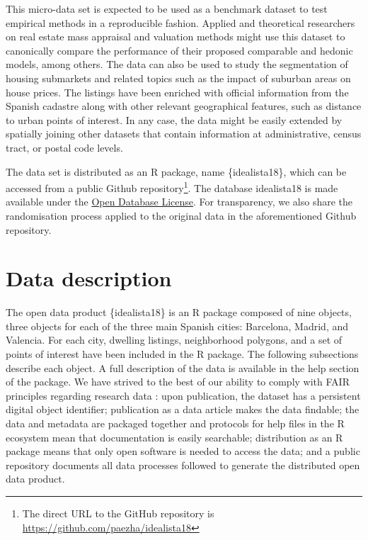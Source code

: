 \documentclass[Royal,times,sageh]{sagej}
\begin{document}
This micro-data set is expected to be used as a benchmark dataset to
test empirical methods in a reproducible fashion. Applied and
theoretical researchers on real estate mass appraisal and valuation
methods might use this dataset to canonically compare the performance of
their proposed comparable and hedonic models, among others. The data can
also be used to study the segmentation of housing submarkets and related
topics such as the impact of suburban areas on house prices. The
listings have been enriched with official information from the Spanish
cadastre along with other relevant geographical features, such as
distance to urban points of interest. In any case, the data might be
easily extended by spatially joining other datasets that contain
information at administrative, census tract, or postal code levels.

The data set is distributed as an R package, name \{idealista18\}, which
can be accessed from a public Github
repository\footnote{The direct URL to the GitHub repository is \url{https://github.com/paezha/idealista18}}.
The database idealista18 is made available under the
\href{http://opendatacommons.org/licenses/odbl/1.0/}{Open Database License}.
For transparency, we also share the randomisation process applied to the
original data in the aforementioned Github repository.

\hypertarget{data-description}{%
\section{Data description}\label{data-description}}

The open data product \{idealista18\} is an R package composed of nine
objects, three objects for each of the three main Spanish cities:
Barcelona, Madrid, and Valencia. For each city, dwelling listings,
neighborhood polygons, and a set of points of interest have been
included in the R package. The following subsections describe each
object. A full description of the data is available in the help section
of the package. We have strived to the best of our ability to comply
with FAIR principles regarding research data \citep{Wilkinson2016fair}:
upon publication, the dataset has a persistent digital object
identifier; publication as a data article makes the data findable; the
data and metadata are packaged together and protocols for help files in
the R ecosystem mean that documentation is easily searchable;
distribution as an R package means that only open software is needed to
access the data; and a public repository documents all data processes
followed to generate the distributed open data product.
\end{document}

